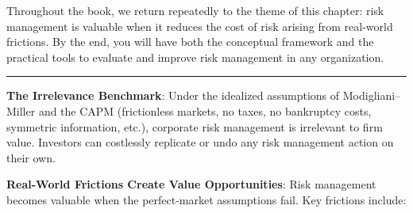 \documentclass[11pt,openany]{book}
\begin{document}
Throughout the book, we return repeatedly to the theme of this chapter: risk management is valuable when it reduces the cost of risk arising from real-world frictions. By the end, you will have both the conceptual framework and the practical tools to evaluate and improve risk management in any organization.

\begin{center}\rule{0.5\linewidth}{0.5pt}\end{center}

\begin{keytakeaways}
\item
  \textbf{The Irrelevance Benchmark}: Under the idealized assumptions of Modigliani--Miller and the CAPM (frictionless markets, no taxes, no bankruptcy costs, symmetric information, etc.), corporate risk management is irrelevant to firm value. Investors can costlessly replicate or undo any risk management action on their own.
\item
  \textbf{Real-World Frictions Create Value Opportunities}: Risk management becomes valuable when the perfect-market assumptions fail. Key frictions include:


\end{keytakeaways}
\end{document}
